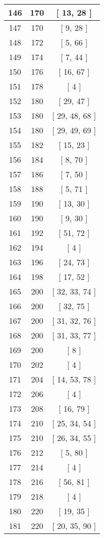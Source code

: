 \begin{center}
\begin{longtable}[H]{|| c c c ||}
\hline
146 & 170 & [ 13, 28 ] \\ 
\hline
147 & 170 & [ 9, 28 ] \\ 
\hline
148 & 172 & [ 5, 66 ] \\ 
\hline
149 & 174 & [ 7, 44 ] \\ 
\hline
150 & 176 & [ 16, 67 ] \\ 
\hline
151 & 178 & [ 4 ] \\ 
\hline
152 & 180 & [ 29, 47 ] \\ 
\hline
153 & 180 & [ 29, 48, 68 ] \\ 
\hline
154 & 180 & [ 29, 49, 69 ] \\ 
\hline
155 & 182 & [ 15, 23 ] \\ 
\hline
156 & 184 & [ 8, 70 ] \\ 
\hline
157 & 186 & [ 7, 50 ] \\ 
\hline
158 & 188 & [ 5, 71 ] \\ 
\hline
159 & 190 & [ 13, 30 ] \\ 
\hline
160 & 190 & [ 9, 30 ] \\ 
\hline
161 & 192 & [ 51, 72 ] \\ 
\hline
162 & 194 & [ 4 ] \\ 
\hline
163 & 196 & [ 24, 73 ] \\ 
\hline
164 & 198 & [ 17, 52 ] \\ 
\hline
165 & 200 & [ 32, 33, 74 ] \\ 
\hline
166 & 200 & [ 32, 75 ] \\ 
\hline
167 & 200 & [ 31, 32, 76 ] \\ 
\hline
168 & 200 & [ 31, 33, 77 ] \\ 
\hline
169 & 200 & [ 8 ] \\ 
\hline
170 & 202 & [ 4 ] \\ 
\hline
171 & 204 & [ 14, 53, 78 ] \\ 
\hline
172 & 206 & [ 4 ] \\ 
\hline
173 & 208 & [ 16, 79 ] \\ 
\hline
174 & 210 & [ 25, 34, 54 ] \\ 
\hline
175 & 210 & [ 26, 34, 55 ] \\ 
\hline
176 & 212 & [ 5, 80 ] \\ 
\hline
177 & 214 & [ 4 ] \\ 
\hline
178 & 216 & [ 56, 81 ] \\ 
\hline
179 & 218 & [ 4 ] \\ 
\hline
180 & 220 & [ 19, 35 ] \\ 
\hline
181 & 220 & [ 20, 35, 90 ] \\ 

\end{longtable}
\end{center}

